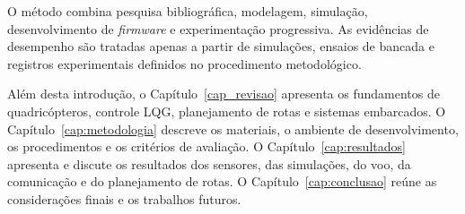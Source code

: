 O método combina pesquisa bibliográfica, modelagem, simulação, desenvolvimento de \textit{firmware} e experimentação progressiva. As evidências de desempenho são tratadas apenas a partir de simulações, ensaios de bancada e registros experimentais definidos no procedimento metodológico.

Além desta introdução, o Capítulo~\ref{cap_revisao} apresenta os fundamentos de quadricópteros, controle LQG, planejamento de rotas e sistemas embarcados. O Capítulo~\ref{cap:metodologia} descreve os materiais, o ambiente de desenvolvimento, os procedimentos e os critérios de avaliação. O Capítulo~\ref{cap:resultados} apresenta e discute os resultados dos sensores, das simulações, do voo, da comunicação e do planejamento de rotas. O Capítulo~\ref{cap:conclusao} reúne as considerações finais e os trabalhos futuros.
